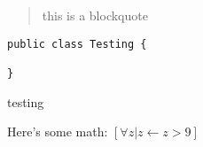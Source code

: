 
\begin{quote}
this is a blockquote
\end{quote}

\begin{program}
\begin{lstlisting}
public class Testing {

}
\end{lstlisting}
  \caption{testing}
\end{program}

Here's some math: $[\forall z | z \leftarrow z > 9] $


